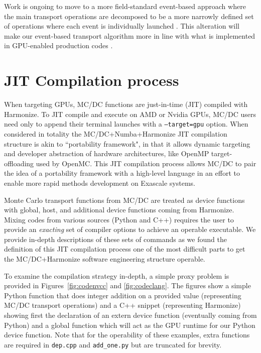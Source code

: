 Work is ongoing to move to a more field-standard event-based approach where the main transport operations are decomposed to be a more narrowly defined set of operations where each event is individually launched \cite{brown_stack}.
This alteration will make our event-based transport algorithm more in line with what is implemented in GPU-enabled production codes \cite{hamilton_multigroup_2018, pozulp_progress_2023, choi_optimization_2021, molnar_gpu_based_2019, tramm2024performanceportablemontecarlo}.

\section{JIT Compilation process}
\label{sec:jit}

When targeting GPUs, MC/DC functions are just-in-time (JIT) compiled with Harmonize.
To JIT compile and execute on AMD or Nvidia GPUs, MC/DC users need only to append their terminal launches with a \texttt{--target=gpu} option.
When considered in totality the MC/DC+Numba+Harmonize JIT compilation structure is akin to ``portability framework", in that it allows dynamic targeting and developer abstraction of hardware architectures, like OpenMP target-offloading used by OpenMC.
This JIT compilation process allows MC/DC to pair the idea of a portability framework with a high-level language in an effort to enable more rapid methods development on Exascale systems.

Monte Carlo transport functions from MC/DC are treated as device functions with global, host, and additional device functions coming from Harmonize.
Mixing codes from various sources (Python and C++) requires the user to provide an \textit{exacting} set of compiler options to achieve an operable executable.
We provide in-depth descriptions of these sets of commands as we found the definition of this JIT compilation process one of the most difficult parts to get the MC/DC+Harmonize software engineering structure operable.

To examine the compilation strategy in-depth, a simple proxy problem is provided in Figures~\ref{fig:codenvcc} and \ref{fig:codeclang}.
The figures show a simple Python function that does integer addition on a provided value (representing MC/DC transport operations) and a C++ snippet (representing Harmonize) showing first the declaration of an extern device function (eventually coming from Python) and a global function which will act as the GPU runtime for our Python device function.
Note that for the operability of these examples, extra functions are required in \texttt{dep.cpp} and \texttt{add\_one.py} but are truncated for brevity.

